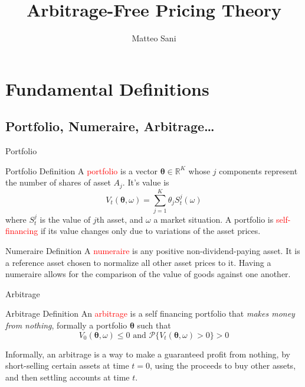 \documentclass{beamer}
\title{Arbitrage-Free Pricing Theory}
\author{Matteo Sani}
\begin{document}
	\begin{frame}[plain]
		\maketitle
	\end{frame}

\section{Fundamental Definitions}
\subsection{Portfolio, Numeraire, Arbitrage\ldots}
\begin{frame}{Portfolio}
	\begin{block}{Portfolio Definition}
		A \textcolor{red}{portfolio} is a vector $\mathbf{\theta}\in \mathbb{R}^K$ whose $j$ components represent the number of shares of asset $A_j$. It's value is
		\begin{equation}
			V_t(\mathbf{\theta}, \omega)=\sum_{j=1}^K\theta_jS^j_t(\omega)
		\end{equation} 
		where $S_t^j$ is the value of $j$th asset, and $\omega$ a market situation. A portfolio is \textcolor{red}{self-financing} if its value changes only due to variations of the asset prices.
	\end{block}
\begin{block}{Numeraire Definition}
A \textcolor{red}{numeraire} is any positive non-dividend-paying asset. It is a reference asset chosen to normalize all other asset prices to it. Having a numeraire allows for the comparison of the value of goods against one another.
\end{block}
\end{frame}

\begin{frame}{Arbitrage}
	\begin{block}{Arbitrage Definition}
		An \textcolor{red}{arbitrage} is a self financing portfolio that \emph{makes money from nothing}, formally a portfolio $\mathbf{\theta}$ such that
		\begin{equation}
				V_0(\mathbf{\theta}, \omega)\le 0 \text{ and } \mathcal{P}\{V_t(\mathbf{\theta}, \omega) > 0\} > 0
		\end{equation}
	\end{block}
	Informally, an arbitrage is a way to make a guaranteed profit from nothing, by short-selling certain assets at time $t = 0$, using the proceeds to buy other assets, and then settling accounts at time $t$.
\end{frame}
\end{document}
